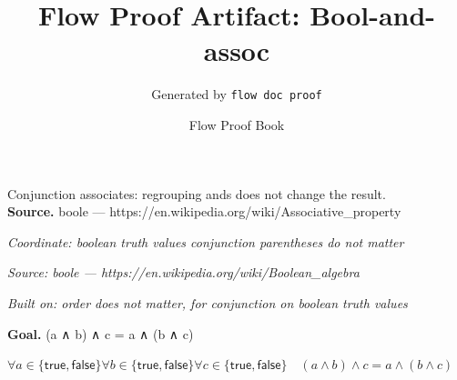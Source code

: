 \documentclass[11pt]{article}
\title{Flow Proof Artifact: Bool-and-assoc}
\author{Generated by \texttt{flow doc proof}}
\date{Flow Proof Book}
\theoremstyle{definition}
\begin{document}
\maketitle
Conjunction associates: regrouping ands does not change the result.\\[0.5em]
\textbf{Source.} boole — https://en.wikipedia.org/wiki/Associative\_property\\[0.5em]
\bigskip
{}\par
\smallskip\noindent\textit{Coordinate: boolean truth values \cdot conjunction \cdot parentheses do not matter}\par
\smallskip\noindent\textit{Source: boole — https://en.wikipedia.org/wiki/Boolean\_algebra}\par
\smallskip\noindent\textit{Built on: order does not matter, for conjunction on boolean truth values}\par
\medskip
\noindent\textbf{Goal.} (a ∧ b) ∧ c = a ∧ (b ∧ c)\par
\noindent$\displaystyle \forall a \in \{\mathsf{true}, \mathsf{false}\} \forall b \in \{\mathsf{true}, \mathsf{false}\} \forall c \in \{\mathsf{true}, \mathsf{false}\}\quad (a \land b) \land c = a \land (b \land c)$\par
\medskip
\noindent
\end{document}

